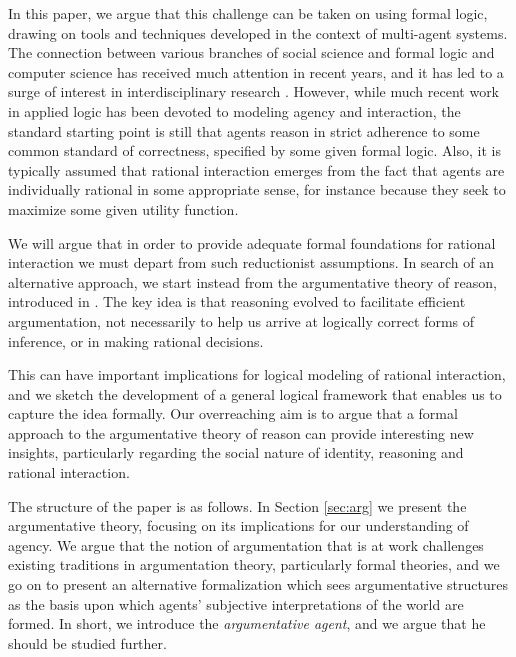 \documentclass[greybox]{svmult}
\begin{document}
In this paper, we argue that this challenge can be taken on using formal logic, drawing on tools and techniques developed in the context of multi-agent systems. The connection between various branches of social science and formal logic and computer science has received much attention in recent years, and it has led to a surge of interest in interdisciplinary research \cite{benthem2,verbrugge,parikh}. However, while much recent work in applied logic has been devoted to modeling agency and interaction, the standard starting point is still that agents reason in strict adherence to some common standard of correctness, specified by some given formal logic. Also, it is typically assumed that rational interaction emerges from the fact that agents are individually rational in some appropriate sense, for instance because they seek to maximize some given utility function.

We will argue that in order to provide adequate formal foundations for rational interaction we must depart from such reductionist assumptions. In search of an alternative approach, we start instead from the argumentative theory of reason, introduced in \cite{mercier}. The key idea is that reasoning evolved to facilitate efficient argumentation, not necessarily to help us arrive at logically correct forms of inference, or in making rational decisions. 

This can have important implications for logical modeling of rational interaction, and we sketch the development of a general logical framework that enables us to capture the idea formally. Our overreaching aim is to argue that a formal approach to the argumentative theory of reason can provide interesting new insights, particularly regarding the social nature of identity, reasoning and rational interaction. %

The structure of the paper is as follows. In Section \ref{sec:arg} we present the argumentative theory, focusing on its implications for our understanding of agency. We argue that the notion of argumentation that is at work challenges existing traditions in argumentation theory, particularly formal theories, and we go on to present an alternative formalization which sees argumentative structures as the basis upon which agents' subjective interpretations of the world are formed. In short, we introduce the \emph{argumentative agent}, and we argue that he should be studied further.
\end{document}
